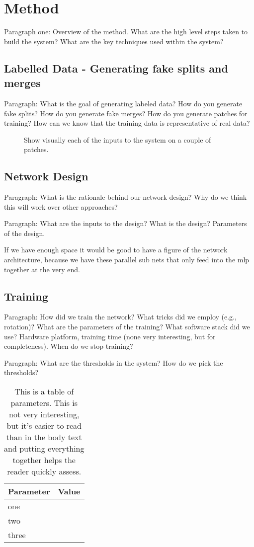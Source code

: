 \section{Method}

Paragraph one: Overview of the method. What are the high level steps taken to build the system? What are the key techniques used within the system?

\subsection{Labelled Data - Generating fake splits and merges}

Paragraph: What is the goal of generating labeled data? How do you generate fake splits? How do you generate fake merges? How do you generate patches for training? How can we know that the training data is representative of real data?

\begin{figure}
\caption{Show visually each of the inputs to the system on a couple of patches.}
\end{figure}

\subsection{Network Design}

Paragraph: What is the rationale behind our network design? Why do we think this will work over other approaches? 

Paragraph: What are the inputs to the design? What is the design? Parameters of the design.

If we have enough space it would be good to have a figure of the network architecture, because we have these 
parallel sub nets that only feed into the mlp together at the very end. 

\subsection{Training}

Paragraph: How did we train the network? What tricks did we employ (e.g., rotation)? What are the parameters of the training? What software stack did we use? Hardware platform, training time (none very interesting, but for completeness). When do we stop training?

Paragraph: What are the thresholds in the system? How do we pick the thresholds?

\begin{table}
\begin{tabular}{ll}
\toprule
Parameter & Value \\
\midrule
one & \\
two & \\
three & \\
\bottomrule
\end{tabular}
\caption{This is a table of parameters. This is not very interesting, but it's easier to read than in the body text and putting everything together helps the reader quickly assess.}
\end{table}